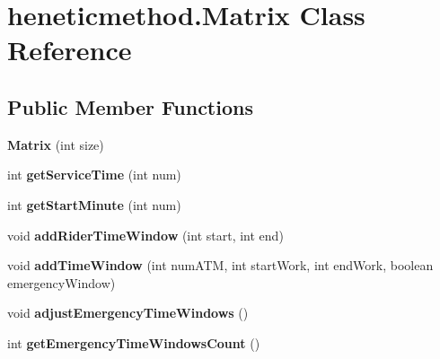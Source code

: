 \hypertarget{classheneticmethod_1_1_matrix}{}\section{heneticmethod.\+Matrix Class Reference}
\label{classheneticmethod_1_1_matrix}
\subsection*{Public Member Functions}
\begin{DoxyCompactItemize}
\item 
{\bfseries Matrix} (int size)\hypertarget{classheneticmethod_1_1_matrix_a2f844a35c00b54a01b6e7e95221ab3b3}{}\label{classheneticmethod_1_1_matrix_a2f844a35c00b54a01b6e7e95221ab3b3}

\item 
int {\bfseries get\+Service\+Time} (int num)\hypertarget{classheneticmethod_1_1_matrix_a0eb24fdf65508f397ed738ed2db0a919}{}\label{classheneticmethod_1_1_matrix_a0eb24fdf65508f397ed738ed2db0a919}

\item 
int {\bfseries get\+Start\+Minute} (int num)\hypertarget{classheneticmethod_1_1_matrix_a0c6325423568cb54761900269eb57213}{}\label{classheneticmethod_1_1_matrix_a0c6325423568cb54761900269eb57213}

\item 
void {\bfseries add\+Rider\+Time\+Window} (int start, int end)\hypertarget{classheneticmethod_1_1_matrix_a3b2f8391f7e7ec6102f1172007755a9a}{}\label{classheneticmethod_1_1_matrix_a3b2f8391f7e7ec6102f1172007755a9a}

\item 
void {\bfseries add\+Time\+Window} (int num\+A\+TM, int start\+Work, int end\+Work, boolean emergency\+Window)\hypertarget{classheneticmethod_1_1_matrix_abba4f1eaf7b878c36005147a2acc31bb}{}\label{classheneticmethod_1_1_matrix_abba4f1eaf7b878c36005147a2acc31bb}

\item 
void {\bfseries adjust\+Emergency\+Time\+Windows} ()\hypertarget{classheneticmethod_1_1_matrix_a57b69ebe02ef371dc77ff08a7b192e68}{}\label{classheneticmethod_1_1_matrix_a57b69ebe02ef371dc77ff08a7b192e68}

\item 
int {\bfseries get\+Emergency\+Time\+Windows\+Count} ()\hypertarget{classheneticmethod_1_1_matrix_a0e31787609b12529e51afc620f647fda}{}\label{classheneticmethod_1_1_matrix_a0e31787609b12529e51afc620f647fda}


\end{DoxyCompactItemize}
